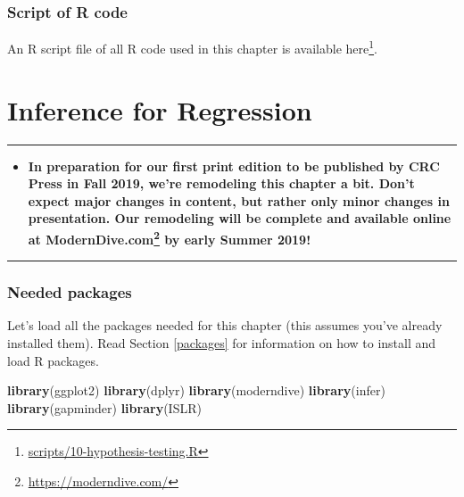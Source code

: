 \documentclass[12pt, krantz2,]{krantz}
\makeatletter
\newenvironment{Shaded}{\begin{snugshade}}{\end{snugshade}}
\newcommand{\KeywordTok}[1]{\textcolor[rgb]{0.27,0.27,0.27}{\textbf{#1}}}
\newcommand{\NormalTok}[1]{#1}
\renewcommand{\href}[2]{#2\footnote{\url{#1}}}
\newenvironment{kframe}{%
\medskip{}
\setlength{\fboxsep}{.8em}
 \def\at@end@of@kframe{}%
 \ifinner\ifhmode%
  \def\at@end@of@kframe{\end{minipage}}%
  \begin{minipage}{\columnwidth}%
 \fi\fi%
 \def\FrameCommand##1{\hskip\@totalleftmargin \hskip-\fboxsep
 \colorbox{shadecolor}{##1}\hskip-\fboxsep
     \hskip-\linewidth \hskip-\@totalleftmargin \hskip\columnwidth}%
 \MakeFramed {\advance\hsize-\width
   \@totalleftmargin\z@ \linewidth\hsize
   \@setminipage}}%
 {\par\unskip\endMakeFramed%
 \at@end@of@kframe}
\renewenvironment{Shaded}{\begin{kframe}}{\end{kframe}}
\newenvironment{rmdblock}[1]
  {\begin{shaded*}
  \begin{itemize}
  \renewcommand{\labelitemi}{
    \raisebox{-.7\height}[0pt][0pt]{
    }
  }
  \item
  }
  {
  \end{itemize}
  \end{shaded*}
  }
\newenvironment{announcement}
  {\begin{rmdblock}{warning}}
  {\end{rmdblock}}
\makeatother
\begin{document}
\hypertarget{script-of-r-code-1}{%
\subsection{Script of R code}\label{script-of-r-code-1}}

An R script file of all R code used in this chapter is available \href{scripts/10-hypothesis-testing.R}{here}.

\hypertarget{inference-for-regression}{%
\chapter{Inference for Regression}\label{inference-for-regression}}

\begin{center}\rule{0.5\linewidth}{\linethickness}\end{center}

\begin{announcement}
\textbf{In preparation for our first print edition to be published by
CRC Press in Fall 2019, we're remodeling this chapter a bit. Don't
expect major changes in content, but rather only minor changes in
presentation. Our remodeling will be complete and available online at
\href{https://moderndive.com/}{ModernDive.com} by early Summer 2019!}
\end{announcement}

\begin{center}\rule{0.5\linewidth}{\linethickness}\end{center}

\hypertarget{needed-packages-9}{%
\subsection*{Needed packages}\label{needed-packages-9}}


Let's load all the packages needed for this chapter (this assumes you've already installed them). Read Section \ref{packages} for information on how to install and load R packages.

\begin{Shaded}
\begin{Highlighting}[]
\KeywordTok{library}\NormalTok{(ggplot2)}
\KeywordTok{library}\NormalTok{(dplyr)}
\KeywordTok{library}\NormalTok{(moderndive)}
\KeywordTok{library}\NormalTok{(infer)}
\KeywordTok{library}\NormalTok{(gapminder)}
\KeywordTok{library}\NormalTok{(ISLR)}
\end{Highlighting}
\end{Shaded}
\end{document}

